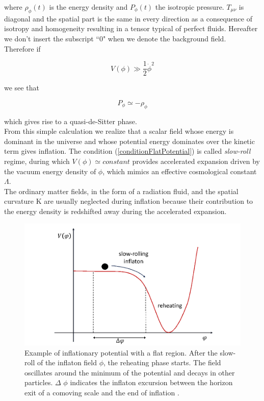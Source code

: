 \documentclass[11pt,a4paper,twoside]{book}
\begin{document}
where $ \rho_{\phi} (t) $ is the energy density and $ P_{\phi} (t) $ the isotropic pressure. $ T_{\mu\nu} $ is diagonal and the spatial part is the same in every direction as a consequence of isotropy and homogeneity resulting in a tensor typical of perfect fluids. Hereafter we don't insert the subscript \textquotedblleft 0" when we denote the background field. \\
Therefore if 

\begin{equation}
	\label{conditionFlatPotential}
	V(\phi) \gg \frac{1}{2} \dot{\phi}^{2}
\end{equation}

we see that 

\begin{equation}
	\label{deSitterCondition}
	P_{\phi} \simeq -\rho_{\phi}
\end{equation}

which gives rise to a quasi-de-Sitter phase.\\
From this simple calculation we realize that a scalar field whose energy is dominant in the universe and whose potential energy dominates over the kinetic term gives inflation. The condition (\ref{conditionFlatPotential}) is called \textit{slow-roll} regime, during which $ V(\phi) \simeq constant $ provides accelerated expansion driven by the vacuum energy density of $ \phi $, which mimics an effective cosmological constant $ \Lambda $.\\
The ordinary matter fields, in the form of a radiation fluid, and the spatial curvature K are usually neglected during inflation because their contribution to the energy density is redshifted away during the accelerated expansion.
\begin{figure}
	\centering
	\includegraphics[width=0.65\linewidth, height=0.25\textheight]{Images/Chap1/GWFromInflation_Fig1}
	\caption{Example of inflationary potential with a flat region. After the slow-roll of the inflaton field $\phi$, the reheating phase starts. The field oscillates around the minimum of the potential and decays in other particles. $\Delta$ $\phi$ indicates the inflaton excursion between the horizon exit of a comoving scale and the end of inflation \cite{GWFromInflation:Intro}. }
	\label{fig:gwfrominflationfig1}
\end{figure}
\end{document}
